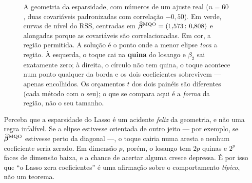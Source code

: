 \documentclass[11pt,a4paper]{article}
\begin{document}
\begin{figure}[htbp]
  \caption{A geometria da esparsidade, com números de um ajuste real ($n=60$, duas
  covariáveis padronizadas com correlação $-0{,}50$). Em verde, curvas de nível do
  RSS, centradas em $\widehat{\bm{\beta}}^{\text{MQO}}=(1{,}573\,;\,0{,}808)$ e
  alongadas porque as covariáveis são correlacionadas. Em cor, a região permitida.
  A solução é o ponto onde a menor elipse \emph{toca} a região. À esquerda, o toque
  cai na \textbf{quina} do losango e $\beta_2$ sai exatamente zero; à direita, o
  círculo não tem quina, o toque acontece num ponto qualquer da borda e os dois
  coeficientes sobrevivem --- apenas encolhidos. Os orçamentos $t$ dos dois painéis
  são diferentes (cada método com o seu); o que se compara aqui é a \emph{forma} da
  região, não o seu tamanho.}
  \label{fig:geometria}
\end{figure}

\begin{atencao}
Perceba que a esparsidade do Lasso é um acidente \emph{feliz} da geometria, e não
uma regra infalível. Se a elipse estivesse orientada de outro jeito --- por exemplo,
se $\widehat{\bm{\beta}}^{\text{MQO}}$ estivesse perto da diagonal ---, o toque cairia
numa aresta e nenhum coeficiente seria zerado. Em dimensão $p$, porém, o losango tem
$2p$ quinas e $2^p$ faces de dimensão baixa, e a chance de acertar alguma cresce
depressa. É por isso que ``o Lasso zera coeficientes'' é uma afirmação sobre o
comportamento \emph{típico}, não um teorema.
\end{atencao}
\end{document}

